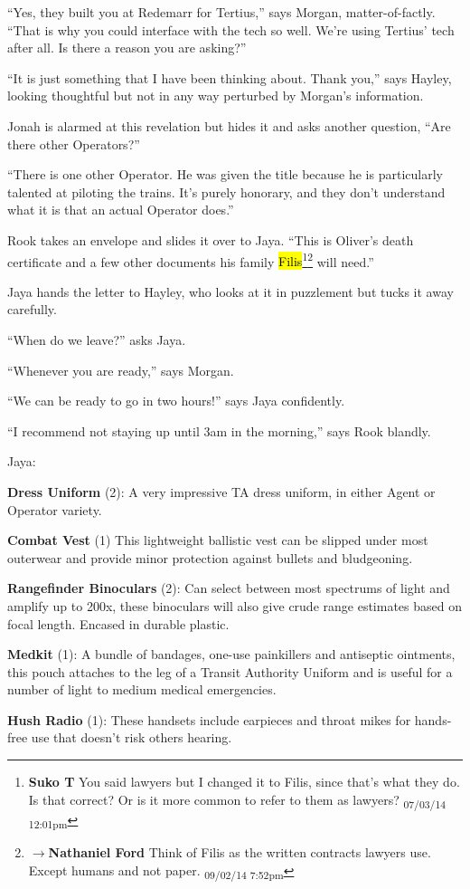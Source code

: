 ``Yes, they built you at Redemarr for Tertius,'' says Morgan, matter-of-factly.  ``That is why you could interface with the tech so well.  We're using Tertius' tech after all.  Is there a reason you are asking?''

``It is just something that I have been thinking about.  Thank you,'' says Hayley, looking thoughtful but not in any way perturbed by Morgan's information.

Jonah is alarmed at this revelation but hides it and asks another question, ``Are there other Operators?''

``There is one other Operator.  He was given the title because he is particularly talented at piloting the trains.  It's purely honorary, and they don't understand what it is that an actual Operator does.''

Rook takes an envelope and slides it over to Jaya.  ``This is Oliver's death certificate and a few other documents his family \hl{Filis}\footnote{\textbf{Suko T }You said lawyers but I changed it to Filis, since that's what they do.  Is that correct?  Or is it more common to refer to them as lawyers? \textsubscript{07/03/14 12:01pm}}\footnote{$\rightarrow$\textbf{Nathaniel Ford }Think of Filis as the written contracts lawyers use. Except humans and not paper. \textsubscript{09/02/14 7:52pm}} will need.''

Jaya hands the letter to Hayley, who looks at it in puzzlement but tucks it away carefully.

``When do we leave?'' asks Jaya.

``Whenever you are ready,'' says Morgan.

``We can be ready to go in two hours!'' says Jaya confidently.

``I recommend not staying up until 3am in the morning,'' says Rook blandly.





Jaya:

{\parskip=0pt
\textbf{Dress Uniform} (2): A very impressive TA dress uniform, in either Agent or Operator variety.

\textbf{Combat Vest} (1) This lightweight ballistic vest can be slipped under most outerwear and provide minor protection against bullets and bludgeoning.

\textbf{Rangefinder Binoculars} (2): Can select between most spectrums of light and amplify up to 200x, these binoculars will also give crude range estimates based on focal length. Encased in durable plastic.

\textbf{Medkit} (1): A bundle of bandages, one-use painkillers and antiseptic ointments, this pouch attaches to the leg of a Transit Authority Uniform and is useful for a number of light to medium medical emergencies.

\textbf{Hush Radio} (1): These handsets include earpieces and throat mikes for hands-free use that doesn't risk others hearing.
}



